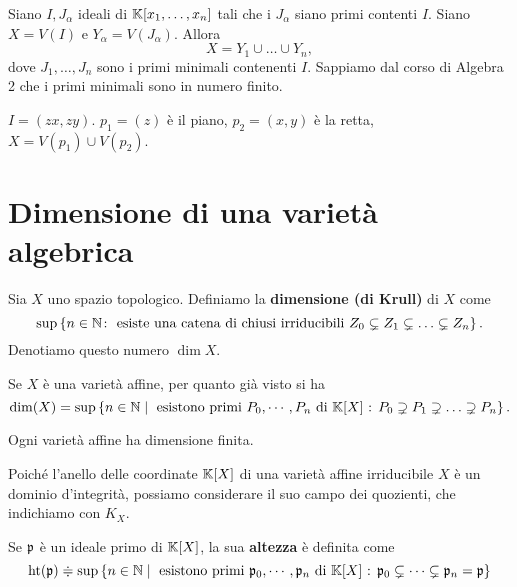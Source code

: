 \begin{remark}
    Siano $I,J_\alpha$ ideali di $\mathbb{K}[x_1,\ldots,x_n]$ tali che i $J_\alpha$ siano primi contenti $I$. Siano $X=V(I)$ e $Y_\alpha=V(J_\alpha)$. Allora 
    \[X=Y_1\cup \ldots \cup Y_n,\] 
    dove $J_1,\ldots,J_n$ sono i primi minimali contenenti $I$. Sappiamo dal corso di Algebra 2 che i primi minimali sono in numero finito.
\end{remark}

\begin{example}
    $I=(zx,zy)$. $p_1=(z)$ è il piano, $p_2=(x,y)$ è la retta, $X=V(p_1)\cup V(p_2)$.
\end{example}


\section{Dimensione di una varietà algebrica}

\begin{definition}
    Sia $X$ uno spazio topologico. Definiamo la \textbf{dimensione (di Krull)} di $X$ come 
    \[\sup\left\{n\in\mathbb{N} \colon \text{ esiste una catena di chiusi irriducibili } Z_0\subsetneq Z_1 \subsetneq \ldots \subsetneq Z_n\right\}.\]
    Denotiamo questo numero $\dim X$.
\end{definition}

\begin{remark}
    Se $X$ è una varietà affine, per quanto già visto si ha 
    \[\dim(X)=\sup\left\{n\in\mathbb{N}\mid\text{ esistono primi $P_0,\cdots, P_n$ di $\mathbb{K}[X]$ : } P_0\supsetneq P_1 \supsetneq \ldots \supsetneq P_n\right\}.\] 
\end{remark}

\begin{theorem}
    Ogni varietà affine ha dimensione finita.
\end{theorem}

Poiché l'anello delle coordinate $\mathbb{K}[X]$ di una varietà affine irriducibile $X$ è un dominio d'integrità, possiamo considerare il suo campo dei quozienti, che indichiamo con $K_X$.

\begin{definition}[Altezza]
Se $\mathfrak{p}$ è un ideale primo di $\mathbb{K}[X]$, la sua \textbf{altezza} è definita come 
\[\operatorname{ht}(\mathfrak{p})\doteqdot \sup\left\{n\in\mathbb{N} \mid \text{ esistono primi $\mathfrak{p}_0,\cdots, \mathfrak{p}_n$ di $\mathbb{K}[X]$ : } \mathfrak{p}_0\subsetneq \cdots \subsetneq \mathfrak{p}_n=\mathfrak{p}\right\}\]
\end{definition}

